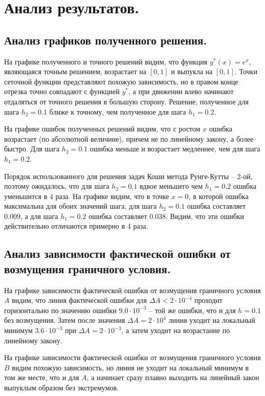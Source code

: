 \documentclass[a4paper, 12pt]{article}
\begin{document}
	\section{Анализ результатов.}
	
	\subsection{Анализ графиков полученного решения.}
	
	На графике полученного и точного решений видим, что функция $y^*(x)=e^x$, являющаяся точным решением, возрастает на $[0,1]$ и выпукла на $[0,1]$. Точки сеточной функции представляют похожую зависимость, но в правом конце отрезка точно совпадают с функцией $y^*$, а при движении влево начинают отдаляться от точного решения в большую сторону. Решение, полученное для шага $h_2=0.1$ ближе к точному, чем полученное для шага $h_1=0.2$.
	
	На графике ошибок полученных решений видим, что с ростом $x$ ошибка возрастает (по абсолютной величине), причем не по линейному закону, а более быстро. Для шага $h_2=0.1$ ошибка меньше и возрастает медленнее, чем для шага $h_1=0.2$. 
	
	Порядок использованного для решения задач Коши метода Рунге-Кутты -- 2-ой, поэтому ожидалось, что для шага $h_2=0.1$ вдвое меньшего чем $h_1=0.2$ ошибка уменьшится в 4 раза. На графике видим, что в точке $x=0$, в которой ошибка максимальна для обоих значений шага, для шага $h_2=0.1$ ошибка составляет $0.009$, а для шага $h_1 = 0.2$ ошибка составляет $0.038$. Видим, что эти ошибки действительно отличаются примерно в 4 раза.
	
	\subsection{Анализ зависимости фактической ошибки от возмущения граничного условия.}
	
	На графике зависимости фактической ошибки от возмущения граничного условия $A$ видим, что линия фактической ошибки для $\Delta A < 2\cdot10^{-4}$ проходит горизонтально по значению ошибки $9.0\cdot10^{-3}$ -- той же ошибки, что и для $h=0.1$ без возмущения. Затем после значения $\Delta A = 2\cdot10^4$ линия уходит на локальный минимум $3.6\cdot10^{-3}$ при $\Delta A = 2\cdot10^{-3}$, а затем уходит на возрастание по линейному закону.
	
	На графике зависимости фактической ошибки от возмущения граничного условия $B$ видим похожую зависимость, но линия не уходит на локальный минимум в том же месте, что и для $A$, а начинает сразу плавно выходить на линейный закон выпуклым образом без экстремумов.
	
\end{document}
